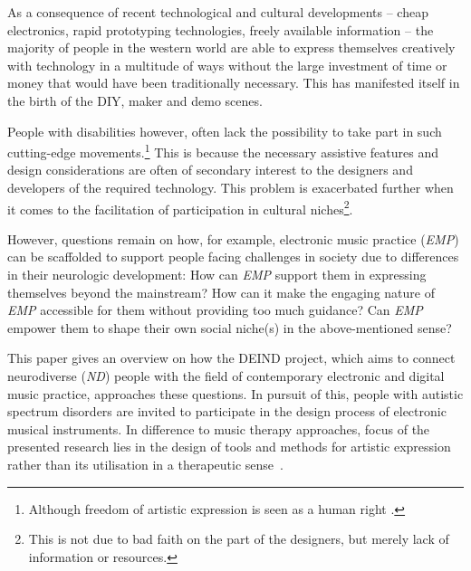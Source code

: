 \documentclass{chi-ext}
\begin{document}
\begin{multicols}{2}
As a consequence of recent technological and cultural developments -- cheap electronics, rapid prototyping technologies, freely available information -- the majority of people in the western world are able to express themselves creatively with technology in a multitude of ways without the large investment of time or money that would have been traditionally necessary. 
This has manifested itself in the birth of the DIY, maker and demo scenes.


People with disabilities however, often lack the possibility to take part in such cutting-edge movements.\footnote{Although freedom of artistic expression is seen as a human right \cite{shaheed2013-rep}.} 
This is because the necessary assistive features and design considerations are often of secondary interest to the designers and developers of the required technology. 
This problem is exacerbated further when it comes to the facilitation of participation in cultural niches\footnote{This is not due to bad faith on the part of the designers, but merely lack of information or resources.}.

However, questions remain on how, for example, electronic music practice (\emph{EMP}) can be scaffolded to support people facing challenges in society due to differences in their neurologic development:
How can \emph{EMP} support them in expressing themselves beyond the mainstream? 
How can it make the engaging nature of \emph{EMP} accessible for them without providing too much guidance?
Can \emph{EMP} empower them to shape their own social niche(s) in the above-mentioned sense?

This paper gives an overview on how the DEIND project, which aims to connect neurodiverse (\emph{ND}) people with the field of contemporary electronic and digital music practice, approaches these questions.
In pursuit of this, people with autistic spectrum disorders are invited to participate in the design process of electronic musical instruments.
In difference to music therapy approaches, focus of the presented research lies in the design of tools and methods for artistic expression rather than its utilisation in a  therapeutic sense~\cite{aigen2005being}.


\end{multicols}
\end{document}
